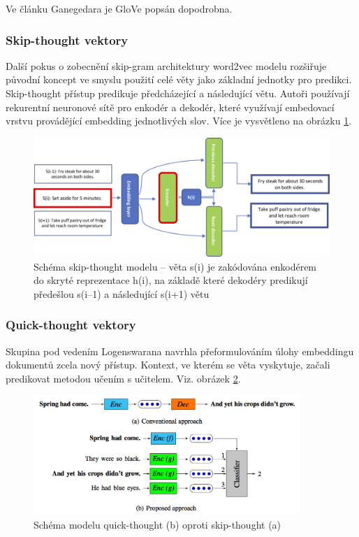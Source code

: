 \documentclass[thesis=M,czech]{FITthesis}[2019/12/23]
\begin{document}
Ve článku Ganegedara\cite{genegedara2019} je GloVe popsán dopodrobna.

\subsubsection*{Skip-thought vektory}
Další pokus o zobecnění skip-gram architektury word2vec modelu rozšiřuje původní koncept ve smyslu použití celé věty jako základní jednotky pro predikci. Skip-thought přístup predikuje předcházející a následující větu. Autoři používají rekurentní neuronové sítě pro enkodér a dekodér, které využívají embedovací vrstvu provádějící embedding jednotlivých slov. Více je vysvětleno na obrázku \ref{fig:palachy2019ST}.
\begin{figure}\centering
	\includegraphics[width=\textwidth]{images/palachy2019/palachy2019_skip-thought.png}
	\caption[Schéma skip-thought modelu]{Schéma skip-thought modelu -- věta s(i) je zakódována enkodérem do skryté reprezentace h(i), na základě které dekodéry predikují předešlou s(i--1) a následující s(i+1) větu\cite{palachy2019}}
	\label{fig:palachy2019ST}
\end{figure}

\subsubsection*{Quick-thought vektory}
Skupina pod vedením Logenswarana\cite{logenswaran2018} navrhla přeformulováním úlohy embeddingu dokumentů zcela nový přístup. Kontext, ve kterém se věta vyskytuje, začali predikovat metodou učením s učitelem. Viz. obrázek \ref{fig:palachy2019QT}.
\begin{figure}\centering
	\includegraphics[width=0.9\textwidth]{images/palachy2019/palachy2019_QT.png}
	\caption{Schéma modelu quick-thought (b) oproti skip-thought (a) \cite{palachy2019}}\label{fig:palachy2019QT}
\end{figure}
\end{document}
